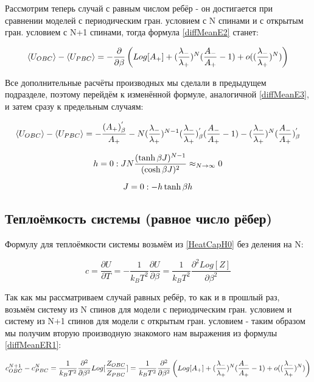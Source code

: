Рассмотрим теперь случай с равным числом ребёр - он достигается при сравнении моделей с периодическим гран. условием с N спинами и с открытым гран. условием с N+1 спинами, тогда формула \eqref{diffMeanE2} станет:

\begin{equation}\label{diffMeanER1}
    \langle U_{OBC} \rangle - \langle U_{PBC} \rangle = -\frac{\partial}{\partial \beta}\left(Log[A_{+}]+(\frac{\lambda_{-}}{\lambda_{+}})^{N}(\frac{A_{-}}{A_{+}} - 1) + o((\frac{\lambda_{-}}{\lambda_{+}})^{N})\right)    
\end{equation}

Все дополнительные расчёты производных мы сделали в предыдущем подразделе, поэтому перейдём к изменённой формуле, аналогичной \eqref{diffMeanE3}, и затем сразу к предельным случаям:

\begin{equation}\label{diffMeanER2}
    \langle U_{OBC} \rangle - \langle U_{PBC} \rangle = -\frac{(A_{+})^{'}_{\beta}}{A_{+}} - N(\frac{\lambda_{-}}{\lambda_{+}})^{N-1}(\frac{\lambda_{-}}{\lambda_{+}})^{'}_{\beta} (\frac{A_{-}}{A_{+}} - 1) - (\frac{\lambda_{-}}{\lambda_{+}})^{N}(\frac{A_{-}}{A_{+}})^{'}_{\beta}
\end{equation}

\[ h = 0: JN\frac{(\tanh{\beta J})^{N-1}}{(\cosh{\beta J})^{2}} \approx_{N\to\infty} 0 \]

\[ J = 0: -h\tanh{\beta h}\]

\subsection{Теплоёмкость системы (равное число рёбер)}

Формулу для теплоёмкости системы возьмём из \eqref{HeatCapH0} без деления на N:

\begin{equation}\label{eq:HeatCap}
c=\frac{\partial U}{\partial T} = -\frac{1}{k_{B}T^{2}}\frac{\partial U}{\partial \beta} = \frac{1}{k_{B}T^{2}}\frac{\partial^{2} Log[Z]}{\partial \beta^{2}}
\end{equation}

Так как мы рассматриваем случай равных ребёр, то как и в прошлый раз, возьмём систему из N спинов для модели с периодическим гран. условием и систему из N+1 спинов для модели с открытым гран. условием - таким образом мы получим вторую производную знакомого нам выражения из формулы \eqref{diffMeanER1}: 

\begin{equation}\label{diffHeatCapER1}
  c_{OBC}^{N+1} - c_{PBC}^{N} = \frac{1}{k_{B}T^{2}} \frac{\partial^{2}}{\partial \beta^{2}} Log[\frac{Z_{OBC}}{Z_{PBC}}] = \frac{1}{k_{B}T^{2}} \frac{\partial^{2}}{\partial \beta^{2}} \left(Log[A_{+}]+(\frac{\lambda_{-}}{\lambda_{+}})^{N}(\frac{A_{-}}{A_{+}} - 1) + o((\frac{\lambda_{-}}{\lambda_{+}})^{N})\right)  
\end{equation}

